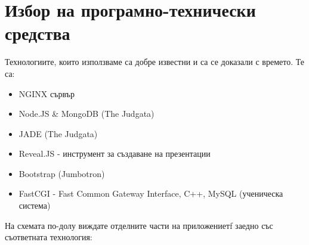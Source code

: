 \documentclass[12pt]{article}
\begin{document}
	\section{Избор на програмно-технически средства}
	Технологиите, които използваме са добре известни и са се доказали с времето. Те са:
	\begin{itemize}
		\item \foreignlanguage{english}{NGINX} сървър
		\item \foreignlanguage{english}{Node.JS \& MongoDB} (\foreignlanguage{english}{The Judgata})
		\item \foreignlanguage{english}{JADE} (\foreignlanguage{english}{The Judgata})
		\item \foreignlanguage{english}{Reveal.JS} - инструмент за създаване на презентации
		\item \foreignlanguage{english}{Bootstrap (Jumbotron)}
		\item \foreignlanguage{english}{FastCGI - Fast Common Gateway Interface, C++, MySQL} (ученическа система)
	\end{itemize}
	\vspace{1cm}
	На \foreignlanguage{bulgarian}{с}хемата по-долу виждате отделните  части на приложениетf заедно със съответната технология:\\
	\vspace{0.5cm} \\
\end{document}
